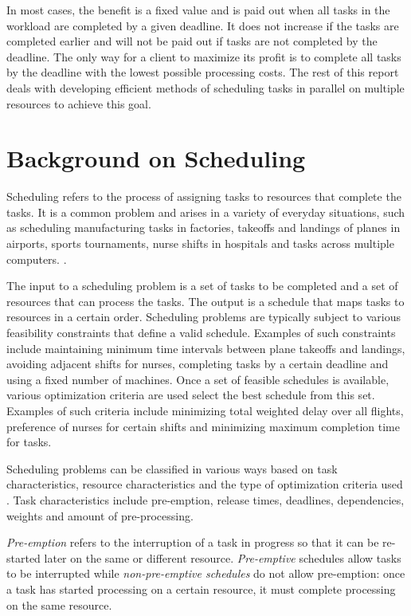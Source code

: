 \documentclass[12pt]{report}
\begin{document}
In most cases, the benefit is a fixed value and is paid out when all tasks in the workload are completed by a given deadline.
It does not increase if the tasks are completed earlier and will not be paid out if tasks are not completed by the deadline.
The only way for a client to maximize its profit is to complete all tasks by the deadline with the lowest possible processing costs.
The rest of this report deals with developing efficient methods of scheduling tasks in parallel on multiple resources to achieve this goal.


\section{Background on Scheduling}

\label{SchedulingOverview}
Scheduling refers to the process of assigning tasks to resources that complete the tasks.
It is a common problem and arises in a variety of everyday situations, such as scheduling manufacturing tasks in factories, takeoffs and landings of planes in airports, sports tournaments, nurse shifts in hospitals and 	tasks across multiple computers. \cite{Hoos2004}.

The input to a scheduling problem is a set of tasks to be completed and a set of resources that can process the tasks.
The output is a schedule that maps tasks to resources in a certain order.
Scheduling problems are typically subject to various feasibility constraints that define a valid schedule.
Examples of such constraints include maintaining minimum time intervals between plane takeoffs and landings, avoiding adjacent shifts for nurses, completing tasks by a certain deadline and using a fixed number of machines.
Once a set of feasible schedules is available, various optimization criteria are used select the best schedule from this set.
Examples of such criteria include minimizing total weighted delay over all flights, preference of nurses for certain shifts and minimizing maximum completion time for tasks.

Scheduling problems can be classified in various ways based on task characteristics, resource characteristics and the type of optimization criteria used \cite{Hoos2004, Pinedo2012}. 
Task characteristics include pre-emption, release times, deadlines, dependencies, weights and amount of pre-processing.

\textit{Pre-emption} refers to the interruption of a task in progress so that it can be re-started later on the same or different resource.
\textit{Pre-emptive} schedules allow tasks to be interrupted while \textit{non-pre-emptive schedules} do not allow pre-emption: once a task has started processing on a certain resource, it must complete processing on the same resource.
\end{document}
